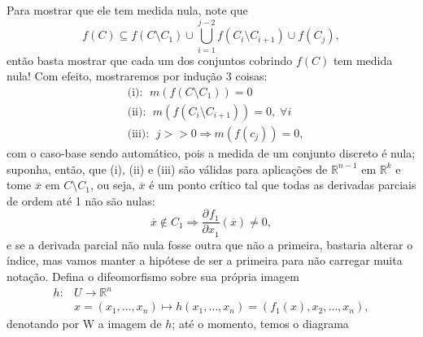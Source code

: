 \documentclass[../differential_topology.tex]{subfiles}
\begin{document}
\begin{proof*}
	Para mostrar que ele tem medida nula, note que
	\[
		f(C) \subseteq  f(C\setminus{C_1})\cup \bigcup_{i=1}^{j-2}f(C_{i}\setminus{C_{i+1}})\cup f(C_{j}),
	\]
	então basta mostrar que cada um dos conjuntos cobrindo \(f(C)\) tem medida nula! Com efeito, mostraremos por indução 3 coisas:
	\begin{align*}
		 & \text{(i): }\; m(f(C\setminus{C_1})) = 0                       \\
		 & \text{(ii): }\; m(f(C_{i}\setminus{C_{i+1}})) = 0,\; \forall i \\
		 & \text{(iii): }\; j > > 0 \Rightarrow m(f(c_{j})) = 0,
	\end{align*}
	com o caso-base sendo automático, pois a medida de um conjunto discreto é nula; suponha, então, que (i), (ii) e (iii) são válidas para aplicações de \(\mathbb{R}^{n-1}\) em \(\mathbb{R}^{k}\) e tome \(\overline{x}\) em \(C\setminus{C_1}\), ou seja, \(\overline{x}\) é um ponto crítico tal que todas as derivadas parciais de ordem até 1 não são nulas:
	\[
		\overline{x}\not\in C_{1} \Rightarrow \frac{\partial^{}f_1}{\partial x_1^{}}(\overline{x})\neq 0,
	\]
	e se a derivada parcial não nula fosse outra que não a primeira, bastaria alterar o índice, mas vamos manter a hipótese de ser a primeira para não carregar muita notação. Defina o difeomorfismo sobre sua própria imagem
	\begin{align*}
		h: & U\rightarrow \mathbb{R}^{n}                                                                \\
		   & x=(x_1, \dotsc , x_{n})\longmapsto h(x_1, \dotsc , x_{n}) = (f_1(x), x_2, \dotsc , x_{n}),
	\end{align*}
	denotando por W a imagem de \(h\); até o momento, temos o diagrama
	\begin{center}
\end{center}
\end{proof*}
\end{document}
